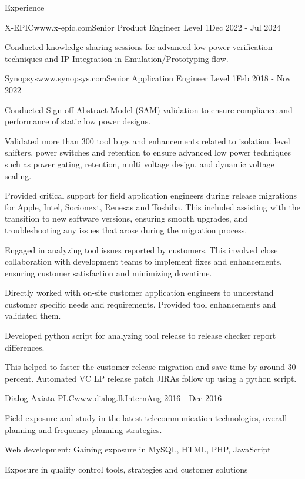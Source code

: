 \documentclass[
11pt, %
]{./assets/resume} %
\begin{document}
\begin{rSection}{Experience}
\begin{rSubsectionX}{X-EPIC}{www.x-epic.com}{Senior Product Engineer Level 1}{Dec 2022 - Jul 2024}
		\item Conducted knowledge sharing sessions for advanced low power verification techniques and IP Integration in Emulation/Prototyping flow.
	\end{rSubsectionX}
	\begin{rSubsectionX}{Synopsys}{www.synopsys.com}{Senior Application Engineer Level 1}{Feb 2018 - Nov 2022}
		\item Conducted Sign-off Abstract Model (SAM) validation to ensure compliance and performance of static low power designs.
		\item Validated more than 300 tool bugs and enhancements related to isolation. level shifters, power switches and retention to ensure advanced low power techniques such as power gating, retention, multi voltage design, and dynamic voltage scaling. 
		\item Provided critical support for field application engineers during release migrations for Apple, Intel, Socionext, Renesas and Toshiba. This included assisting with the transition to new software versions, ensuring smooth upgrades, and troubleshooting any issues that arose during the migration process. 
		\item Engaged in analyzing tool issues reported by customers. This involved close collaboration with development teams to implement fixes and enhancements, ensuring customer satisfaction and minimizing downtime. 
		\item Directly worked with on-site customer application engineers to understand customer specific needs and requirements. Provided tool enhancements and validated them. 
		\item Developed python script for analyzing tool release to release checker report differences. 
		\item This helped to faster the customer release migration and save time by around 30 percent. Automated VC LP release patch JIRAs follow up using a python script.
	\end{rSubsectionX}
	\begin{rSubsectionX}{Dialog Axiata PLC}{www.dialog.lk}{Intern}{Aug 2016 - Dec 2016}
		\item Field exposure and study in the latest telecommunication technologies, overall planning and frequency planning strategies.
		\item Web development: Gaining exposure in MySQL, HTML, PHP, JavaScript
		\item Exposure in quality control tools, strategies and customer solutions
	\end{rSubsectionX}
	
\end{rSection}
\end{document}
